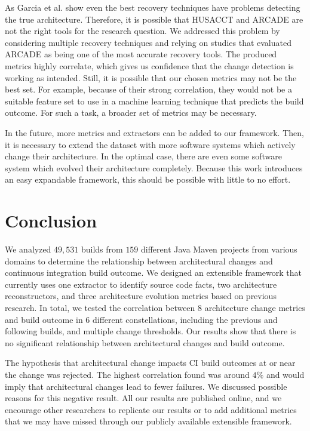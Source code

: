 \documentclass[sigplan, anonymous, review]{acmart}
\begin{document}
As Garcia et al. \cite{arcRec-comparison} show even the best recovery techniques have problems detecting the true architecture. Therefore, it is possible that HUSACCT and ARCADE are not the right tools for the research question. We addressed this problem by considering multiple recovery techniques and relying on studies that evaluated ARCADE as being one of the most accurate recovery tools. The produced metrics highly correlate, which gives us confidence that the change detection is working as intended. Still, it is possible that our chosen metrics may not be the best set. For example, because of their strong correlation, they would not be a suitable feature set to use in a machine learning technique that predicts the build outcome. For such a task, a broader set of metrics may be necessary. 

In the future, more metrics and extractors can be added to our framework.  
Then, it is necessary to extend the dataset with more software systems which actively change their architecture. In the optimal case, there are even some software system which evolved their architecture completely. 
Because this work introduces an easy expandable framework, this should be possible with little to no effort.

\section{Conclusion}

We analyzed $49,531$ builds from $159$ different Java Maven projects from various domains to determine the relationship between architectural changes and continuous integration build outcome.
We designed an extensible framework that currently uses one extractor to identify source code facts, two architecture reconstructors, and three architecture evolution metrics based on previous research.
In total, we tested the correlation between $8$ architecture change metrics and build outcome in $6$ different constellations, including the previous and following builds, and multiple change thresholds.
Our results show that there is no significant relationship between architectural changes and build outcome.

The hypothesis that architectural change impacts CI build outcomes at or near the change was rejected. The highest correlation found was around $4\%$ and would imply that architectural changes lead to fewer failures. 
We discussed possible reasons for this negative result.
All our results are published online, and we encourage other researchers to replicate our results or to add additional metrics that we may have missed through our publicly available extensible framework.



\end{document}
